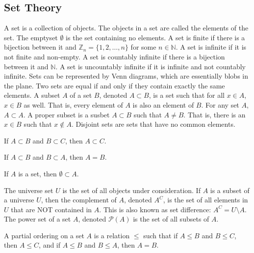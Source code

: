 \documentclass[crop=false,class=book,oneside]{standalone}
\begin{document}
    \subsection{Set Theory}
        A set is a collection of objects. The objects in a
        set are called the elements of the set. The emptyset
        $\emptyset$ is the set containing no elements. A set
        is finite if there is a bijection between it
        and $\mathbb{Z}_{n}=\{1,2,\hdots,n\}$ for some
        $n\in\mathbb{N}$. A set is infinite if it is
        not finite and non-empty.
        A set is countably infinite if there is a bijection
        between it and $\mathbb{N}$. A set is uncountably
        infinite if it is infinite and not
        countably infinite. Sets can be represented by
        Venn diagrams, which are essentially blobs in
        the plane. Two sets are equal if and only if they
        contain exactly the same elements. A subset $A$ of
        a set $B$, denoted $A\subset{B}$, is a set such that
        for all $x\in{A}$, $x\in{B}$ as well. That is, every
        element of $A$ is also an element of $B$. For any
        set $A$, $A\subset{A}$. A proper subset is a susbet
        $A\subset{B}$ such that $A\ne{B}$. That is, there is
        an $x\in{B}$ such that $x\notin{A}$. Disjoint sets
        are sets that have no common elements.
        \begin{theorem}
            If $A\subset{B}$ and $B\subset{C}$,
            then $A\subset{C}$.
        \end{theorem}
        \begin{theorem}
            If $A\subset{B}$ and $B\subset{A}$, then
            $A=B$.
        \end{theorem}
        \begin{theorem}
            If $A$ is a set, then $\emptyset\subset{A}$.
        \end{theorem}
        The universe set $U$ is the set of all objects under
        consideration. If $A$ is a subset of a universe $U$,
        then the complement of $A$, denoted $A^{C}$, is the
        set of all elements in $U$ that are NOT contained
        in $A$. This is also known as set difference:
        $A^{C}=U\setminus{A}$. The power set of a set $A$,
        denoted $\mathcal{P}(A)$ is the set of all subsets
        of $A$.
        \begin{definition}
            A partial ordering on a set $A$ is a
            relation $\leq$ such that if
            $A\leq{B}$ and $B\leq{C}$, then
            $A\leq{C}$, and if $A\leq{B}$ and
            $B\leq{A}$, then $A=B$.
        \end{definition}
\end{document}
